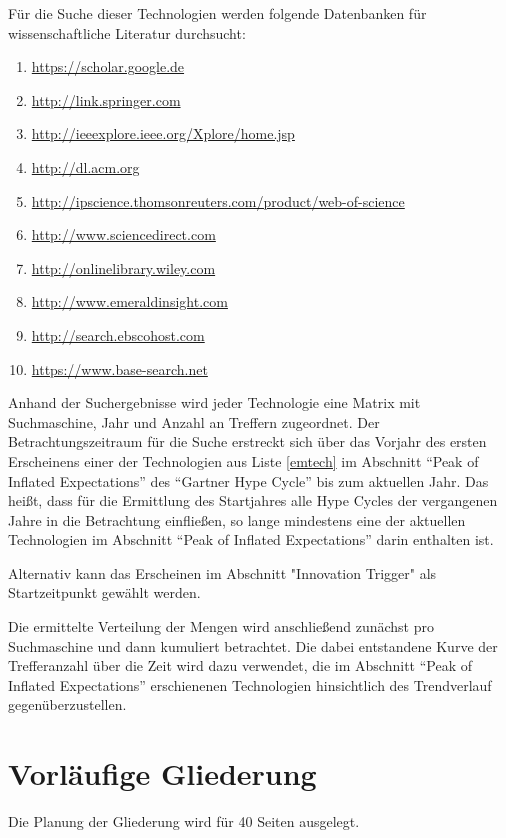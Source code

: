 Für die Suche dieser Technologien werden folgende Datenbanken für wissenschaftliche Literatur durchsucht:
\begin{enumerate}
	\item \url{https://scholar.google.de}
	\item \url{http://link.springer.com}
	\item \url{http://ieeexplore.ieee.org/Xplore/home.jsp}
	\item \url{http://dl.acm.org}
	\item \url{http://ipscience.thomsonreuters.com/product/web-of-science}
	\item \url{http://www.sciencedirect.com}
	\item \url{http://onlinelibrary.wiley.com}
	\item \url{http://www.emeraldinsight.com}
	\item \url{http://search.ebscohost.com}
	\item \url{https://www.base-search.net}
\end{enumerate}

Anhand der Suchergebnisse wird jeder Technologie eine Matrix mit Suchmaschine, Jahr und Anzahl an Treffern zugeordnet. 
Der Betrachtungszeitraum für die Suche erstreckt sich über das Vorjahr des ersten Erscheinens einer der Technologien aus Liste \ref{emtech} im Abschnitt "`Peak of Inflated Expectations"' des "`Gartner Hype Cycle"' bis zum aktuellen Jahr. Das heißt, dass für die Ermittlung des Startjahres alle Hype Cycles der vergangenen Jahre in die Betrachtung einfließen, so lange mindestens eine der aktuellen Technologien im Abschnitt "`Peak of Inflated Expectations"' darin enthalten ist.

Alternativ kann das Erscheinen im Abschnitt "Innovation Trigger" als Startzeitpunkt gewählt werden.

Die ermittelte Verteilung der Mengen wird anschließend zunächst pro Suchmaschine und dann kumuliert betrachtet. Die dabei entstandene Kurve der Trefferanzahl über die Zeit wird dazu verwendet, die im Abschnitt "`Peak of Inflated Expectations"' erschienenen Technologien hinsichtlich des Trendverlauf gegenüberzustellen.

\section{Vorläufige Gliederung}
Die Planung der Gliederung wird für 40 Seiten ausgelegt.

